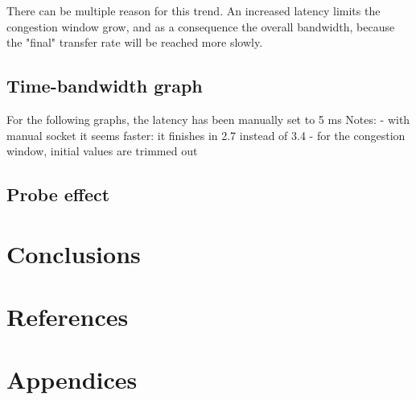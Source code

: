 \documentclass[a4paper,10pt]{article}
\begin{document}
There can be multiple reason for this trend. An increased latency limits the congestion window grow, and as a consequence the overall bandwidth, because the "final" transfer rate will be reached more slowly.

\subsection{Time-bandwidth graph}

For the following graphs, the latency has been manually set to 5 ms
Notes:
- with manual socket it seems faster: it finishes in 2.7 instead of 3.4
- for the congestion window, initial values are trimmed out
\subsection{Probe effect}

\section{Conclusions}

\newpage

\section{References}

\printbibliography

\section{Appendices}
\end{document}
